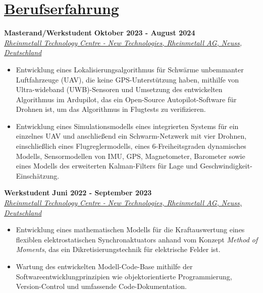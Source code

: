 \section{\underline{Berufserfahrung}}

\large{\textbf{Masterand/Werkstudent}}
\hfill
\large{\textbf{Oktober 2023 - August 2024}}\\
\href{https://www.rheinmetall.com/de/karriere/rheinmetall-als-arbeitgeber/menschen-projekte/karriere-extra-technology-center}{\large{\emph{Rheinmetall Technology Centre - New Technologies, Rheinmetall AG, Neuss, Deutschland}}}
\begin{itemize}
	\item Entwicklung eines Lokalisierungsalgorithmus für Schwärme unbemmanter Luftfahrzeuge (UAV), die keine GPS-Unterstützung haben, mithilfe von Ultra-wideband (UWB)-Sensoren und Umsetzung des entwickelten Algorithmus im Ardupilot, das ein Open-Source Autopilot-Software für Drohnen ist, um das Algorithmus in Flugtests zu verifizieren.
	\item Entwicklung eines Simulationsmodells eines integrierten Systems für ein einzelnes UAV und anschließend ein Schwarm-Netzwerk mit vier Drohnen, einschließlich eines Flugreglermodells, eines 6-Freiheitsgraden dynamisches Modells, Sensormodellen von IMU, GPS, Magnetometer, Barometer sowie eines Modells des erweiterten Kalman-Filters für Lage und Geschwindigkeit-Einschätzung.
\end{itemize}

\vspace{0.1 in}

\large{\textbf{Werkstudent}}
\hfill
\large{\textbf{Juni 2022 - September 2023}}\\
\href{https://www.rheinmetall.com/de/karriere/rheinmetall-als-arbeitgeber/menschen-projekte/karriere-extra-technology-center}{\large{\emph{Rheinmetall Technology Centre - New Technologies, Rheinmetall AG, Neuss, Deutschland}}}
\begin{itemize}
	\item\large{Entwicklung eines mathematischen Modells für die Kraftauswertung eines flexiblen elektrostatischen Synchronaktuators anhand vom Konzept \emph{Method of Moments}, das ein Dikretisierungstechnik für elektrische Felder ist.}
	\item\large{Wartung des entwickelten Modell-Code-Base mithilfe der Softwareentwicklungprinzipien wie objektorientierte Programmierung, Version-Control und umfassende Code-Dokumentation.}
\end{itemize}

